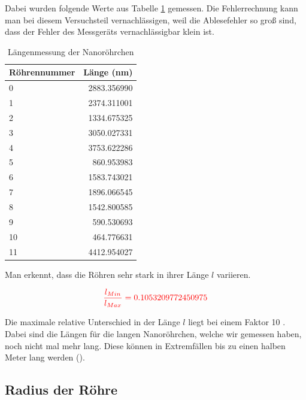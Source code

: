 Dabei wurden folgende Werte aus Tabelle \ref{TabLaenge} gemessen. Die Fehlerrechnung kann man bei diesem 
Versuchsteil vernachlässigen, weil die Ablesefehler so groß sind, dass der Fehler des Messgeräts vernachlässigbar klein ist. \\

\begin{table}
    \centering
    \begin{tabular}{lr}
        \toprule
        Röhrennummer &   Länge (nm) \\
        \midrule
        0  &  2883.356990 \\
        1  &  2374.311001 \\
        2  &  1334.675325 \\
        3  &  3050.027331 \\
        4  &  3753.622286 \\
        5  &   860.953983 \\
        6  &  1583.743021 \\
        7  &  1896.066545 \\
        8  &  1542.800585 \\
        9  &   590.530693 \\
        10 &   464.776631 \\
        11 &  4412.954027 \\
        \bottomrule
    \end{tabular}
    \caption{Längenmessung der Nanoröhrchen}
    \label{TabLaenge}
\end{table}

Man erkennt, dass die Röhren sehr stark in ihrer Länge $l$  variieren.

\begin{equation}
    \textcolor{red}{\frac{l_{Min}}{l_{Max}} = 0.1053209772450975}
\end{equation}

Die maximale relative Unterschied in der Länge $l$ liegt bei einem Faktor 10 . Dabei sind die Längen für die langen 
Nanoröhrchen, welche wir gemessen haben, noch nicht mal mehr lang. Diese können in Extremfällen bis zu
einen halben Meter lang werden (\cite{Dagani2002}).

\subsection*{Radius der Röhre}

